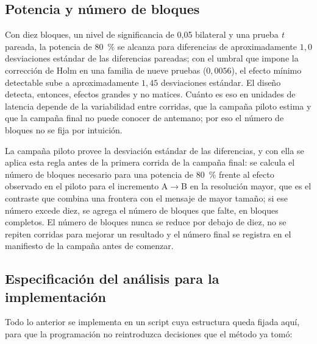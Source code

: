 \subsection{Potencia y número de bloques}
\label{sec:analysis-power}

Con diez bloques, un nivel de significancia de 0,05 bilateral y una prueba
\emph{t} pareada, la potencia de 80~\% se alcanza para diferencias de
aproximadamente $1{,}0$ desviaciones estándar de las diferencias pareadas; con
el umbral que impone la corrección de Holm en una familia de nueve pruebas
($0{,}0056$), el efecto mínimo detectable sube a aproximadamente $1{,}45$
desviaciones estándar. El diseño detecta, entonces, efectos grandes y no
matices. Cuánto es eso en unidades de latencia depende de la variabilidad
entre corridas, que la campaña piloto estima y que la campaña final no puede
conocer de antemano; por eso el número de bloques no se fija por intuición.

La campaña piloto provee la desviación estándar de las diferencias, y con ella
se aplica esta regla antes de la primera corrida de la campaña final: se
calcula el número de bloques necesario para una potencia de 80~\% frente al
efecto observado en el piloto para el incremento A$\to$B en la resolución
mayor, que es el contraste que combina una frontera con el mensaje de mayor
tamaño; si ese número excede diez, se agrega el número de bloques que falte, en
bloques completos. El número de bloques nunca se reduce por debajo de diez, no
se repiten corridas para mejorar un resultado y el número final se registra en
el manifiesto de la campaña antes de comenzar.

\subsection{Especificación del análisis para la implementación}
\label{sec:analysis-spec}

Todo lo anterior se implementa en un script cuya estructura queda fijada aquí,
para que la programación no reintroduzca decisiones que el método ya tomó:

